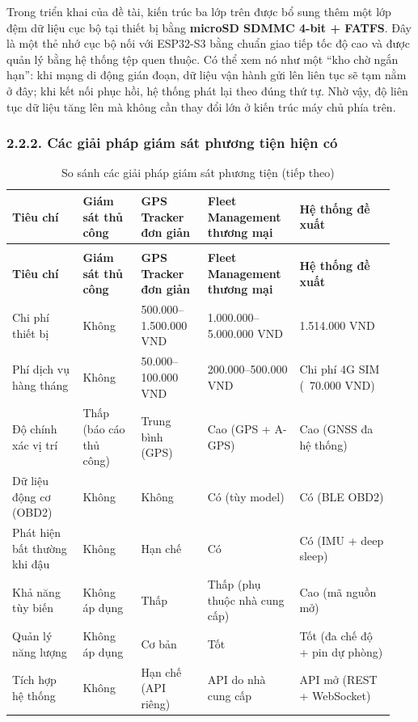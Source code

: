\documentclass[a4paper]{extarticle}
\newcommand{\thesissettableid}[2]{%
  \renewcommand{\thetable}{#1}%
  \renewcommand{\theHtable}{#2}%
}
\begin{document}
Trong triển khai của đề tài, kiến trúc ba lớp trên được bổ sung thêm một
lớp đệm dữ liệu cục bộ tại thiết bị bằng \textbf{microSD SDMMC 4-bit +
FATFS}. Đây là một thẻ nhớ cục bộ nối với ESP32-S3 bằng chuẩn giao tiếp
tốc độ cao và được quản lý bằng hệ thống tệp quen thuộc. Có thể xem nó
như một ``kho chờ ngắn hạn'': khi mạng di động gián đoạn, dữ liệu vận
hành gửi lên liên tục sẽ tạm nằm ở đây; khi kết nối phục hồi, hệ thống
phát lại theo đúng thứ tự. Nhờ vậy, độ liên tục dữ liệu tăng lên mà
không cần thay đổi lớn ở kiến trúc máy chủ phía trên.

\subsubsection{2.2.2. Các giải pháp giám sát phương tiện hiện
có}\label{222-cuxe1c-giux1ea3i-phuxe1p-giuxe1m-suxe1t-phux1b0ux1a1ng-tiux1ec7n-hiux1ec7n-cuxf3}

{\thesissettableid{2.1}{tab-ch2-vehicle-monitoring-solutions-comparison}
\def\LTcaptype{table}
\begin{longtable}{|L{0.179\linewidth}|L{0.141\linewidth}|L{0.167\linewidth}|L{0.227\linewidth}|L{0.231\linewidth}|}
\caption{So sánh các giải pháp giám sát phương tiện}\label{tab:ch2-vehicle-monitoring-solutions-comparison}\\
\hline \textbf{Tiêu chí} & \textbf{Giám sát thủ công} & \textbf{GPS Tracker đơn giản} & \textbf{Fleet Management
thương mại} & \textbf{Hệ thống đề xuất} \\
\hline
\endfirsthead
\caption[]{So sánh các giải pháp giám sát phương tiện (tiếp theo)}\\
\hline \textbf{Tiêu chí} & \textbf{Giám sát thủ công} & \textbf{GPS Tracker đơn giản} & \textbf{Fleet Management
thương mại} & \textbf{Hệ thống đề xuất} \\
\hline
\endhead
\hline
\endfoot
\endlastfoot
Chi phí thiết bị & Không & 500.000--1.500.000 VND & 1.000.000--5.000.000
VND & 1.514.000 VND \\\hline
Phí dịch vụ hàng tháng & Không & 50.000--100.000 VND & 200.000--500.000
VND & Chi phí 4G SIM (~70.000 VND) \\\hline
Độ chính xác vị trí & Thấp (báo cáo thủ công) & Trung bình (GPS) & Cao
(GPS + A-GPS) & Cao (GNSS đa hệ thống) \\\hline
Dữ liệu động cơ (OBD2) & Không & Không & Có (tùy model) & Có (BLE
OBD2) \\\hline
Phát hiện bất thường khi đậu & Không & Hạn chế & Có & Có (IMU + deep
sleep) \\\hline
Khả năng tùy biến & Không áp dụng & Thấp & Thấp (phụ thuộc nhà cung cấp) & Cao
(mã nguồn mở) \\\hline
Quản lý năng lượng & Không áp dụng & Cơ bản & Tốt & Tốt (đa chế độ + pin
dự phòng) \\\hline
Tích hợp hệ thống & Không & Hạn chế (API riêng) & API do nhà cung cấp & API mở
(REST + WebSocket) \\\hline
\end{longtable}
}
\end{document}
